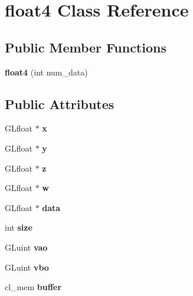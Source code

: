\hypertarget{classfloat4}{}\section{float4 Class Reference}
\label{classfloat4}
\subsection*{Public Member Functions}
\begin{DoxyCompactItemize}
\item 
\mbox{\label{classfloat4_ac3077068b83e5f811ac6be252a97ffcf}} 
{\bfseries float4} (int num\+\_\+data)
\end{DoxyCompactItemize}
\subsection*{Public Attributes}
\begin{DoxyCompactItemize}
\item 
\mbox{\label{classfloat4_aefa8e024f89040a7271f5896457a5f2c}} 
G\+Lfloat $\ast$ {\bfseries x}
\item 
\mbox{\label{classfloat4_a3dfb904f6898f8bdbe47a450f6c81451}} 
G\+Lfloat $\ast$ {\bfseries y}
\item 
\mbox{\label{classfloat4_a6dfbe997e1135d1334d105eab8ed572a}} 
G\+Lfloat $\ast$ {\bfseries z}
\item 
\mbox{\label{classfloat4_a0ddbfe7e8c7d6cbf302f1a6d3ffc88c4}} 
G\+Lfloat $\ast$ {\bfseries w}
\item 
\mbox{\label{classfloat4_aab5f744766865e6f8ac1b5502767cdd3}} 
G\+Lfloat $\ast$ {\bfseries data}
\item 
\mbox{\label{classfloat4_af6938cc4d9eeff3f7ab1be2c37a896de}} 
int {\bfseries size}
\item 
\mbox{\label{classfloat4_a7878a5e45a914b1d48ec6dee3a5dc298}} 
G\+Luint {\bfseries vao}
\item 
\mbox{\label{classfloat4_a63b90166dbacd1af04968c10e113a93d}} 
G\+Luint {\bfseries vbo}
\item 
\mbox{\label{classfloat4_a43b3724c6ed856bef35725706328bd34}} 
cl\+\_\+mem {\bfseries buffer}
\end{DoxyCompactItemize}


